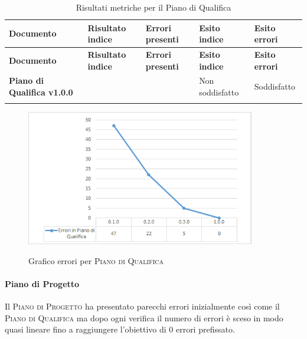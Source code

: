 \documentclass[../piano-di-qualifica.tex]{subfiles}
\begin{document}
\renewcommand{\arraystretch}{2} %
\begin{longtable}[H]{>{\centering\bfseries}m{6cm} >{\centering}m{2cm} >{\centering}m{2.5cm} >{\centering}m{2.5cm} >{\centering\arraybackslash}m{2.5cm}}  
  \rowcolor{lightgray}
  {\textbf{Documento}} & {\textbf{Risultato indice}} & {\textbf{Errori presenti}} & {\textbf{Esito indice}} & {\textbf{Esito errori}}  \\
  \endfirsthead%
  \rowcolor{lightgray}
  {\textbf{Documento}} & {\textbf{Risultato indice}} & {\textbf{Errori presenti}} & {\textbf{Esito indice}} & {\textbf{Esito errori}}  \\
  \endhead%
  \textbf{Piano di Qualifica v1.0.0} &                  & 0               & Non soddisfatto & Soddisfatto \\
  \caption{Risultati metriche per il Piano di Qualifica}
  \label{tab:my-table}
\end{longtable}

\begin{figure}[H]
    \centering
    \includegraphics[width=10cm]{img/erroriPdQ.png}
    \label{fig:scice_documenti}
    \caption{Grafico errori per \textsc{Piano di Qualifica}}
\end{figure}

\paragraph{Piano di Progetto}
\label{sub:piano_di_progetto}
Il \textsc{Piano di Progetto} ha presentato parecchi errori inizialmente così come il \textsc{Piano di Qualifica} ma dopo ogni verifica il numero di errori è sceso in modo quasi lineare fino a raggiungere l'obiettivo di 0 errori prefissato.
\end{document}
